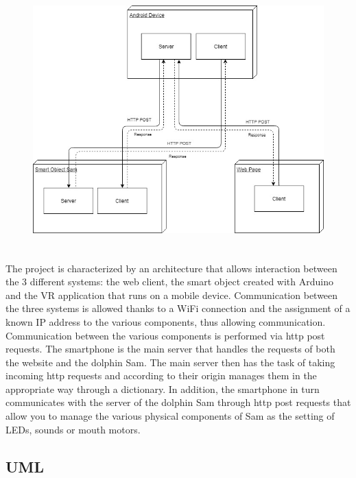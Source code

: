 \documentclass [12pt]{article}
\begin{document}
\begin{figure}[ht!]
\centering
\includegraphics[height=10cm,width=13cm]{HWarchitecture.jpg}
\end{figure}   
The project is characterized by an architecture that allows interaction between the 3 different systems: the web client, the smart object created with Arduino and the VR application that runs on a mobile device.
Communication between the three systems is allowed thanks to a WiFi connection and the assignment of a known IP address to the various components, thus allowing communication. 
Communication between the various components is performed via http post requests.
The smartphone is the main server that handles the requests of both the website and the dolphin Sam. The main server then has the task of taking incoming http requests and according to their origin manages them in the appropriate way through a dictionary. In addition, the smartphone in turn communicates with the server of the dolphin Sam through http post requests that allow you to manage the various physical components of Sam as the setting of LEDs, sounds or mouth motors.
\clearpage

\subsection{UML}
\end{document}
